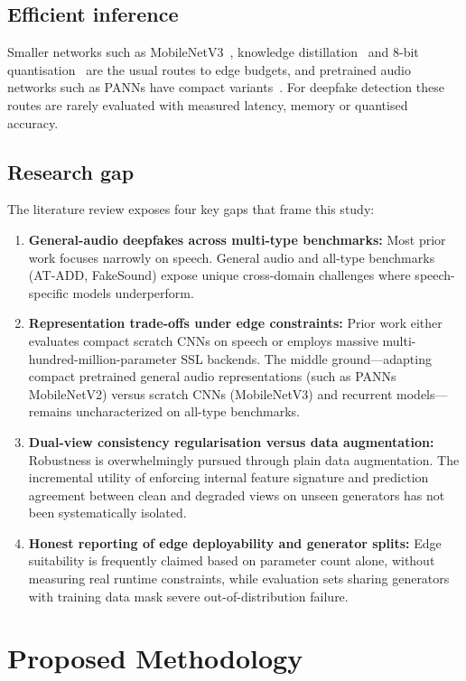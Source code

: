 \documentclass[12pt,a4paper]{report}
\begin{document}
\section{Efficient inference}

Smaller networks such as MobileNetV3~\cite{howard2019mobilenetv3}, knowledge distillation~\cite{hinton2015distilling} and 8-bit quantisation~\cite{jacob2018quantization} are the usual routes to edge budgets, and pretrained audio networks such as PANNs have compact variants~\cite{kong2020panns}. For deepfake detection these routes are rarely evaluated with measured latency, memory or quantised accuracy.

\section{Research gap}

The literature review exposes four key gaps that frame this study:
\begin{enumerate}
  \item \textbf{General-audio deepfakes across multi-type benchmarks:} Most prior work focuses narrowly on speech. General audio and all-type benchmarks (AT-ADD, FakeSound) expose unique cross-domain challenges where speech-specific models underperform.
  \item \textbf{Representation trade-offs under edge constraints:} Prior work either evaluates compact scratch CNNs on speech or employs massive multi-hundred-million-parameter SSL backends. The middle ground---adapting compact pretrained general audio representations (such as PANNs MobileNetV2) versus scratch CNNs (MobileNetV3) and recurrent models---remains uncharacterized on all-type benchmarks.
  \item \textbf{Dual-view consistency regularisation versus data augmentation:} Robustness is overwhelmingly pursued through plain data augmentation. The incremental utility of enforcing internal feature signature and prediction agreement between clean and degraded views on unseen generators has not been systematically isolated.
  \item \textbf{Honest reporting of edge deployability and generator splits:} Edge suitability is frequently claimed based on parameter count alone, without measuring real runtime constraints, while evaluation sets sharing generators with training data mask severe out-of-distribution failure.
\end{enumerate}

\chapter{Proposed Methodology}
\label{ch:methodology}
\end{document}
